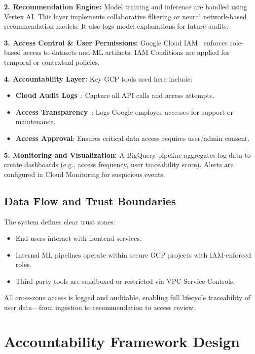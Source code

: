 \documentclass[acmsmall]{acmart}
\begin{document}
\textbf{2. Recommendation Engine:}  
Model training and inference are handled using Vertex AI. This layer implements collaborative filtering or neural network-based recommendation models. It also logs model explanations for future audits.

\textbf{3. Access Control \& User Permissions:}  
Google Cloud IAM~\cite{gcp_iam} enforces role-based access to datasets and ML artifacts. IAM Conditions are applied for temporal or contextual policies.

\textbf{4. Accountability Layer:}  
Key GCP tools used here include:
\begin{itemize}
  \item \textbf{Cloud Audit Logs}~\cite{gcp_auditlogs}: Capture all API calls and access attempts.
  \item \textbf{Access Transparency}~\cite{gcp_transparency}: Logs Google employee accesses for support or maintenance.
  \item \textbf{Access Approval}: Ensures critical data access requires user/admin consent.
\end{itemize}

\textbf{5. Monitoring and Visualization:}  
A BigQuery pipeline aggregates log data to create dashboards (e.g., access frequency, user traceability score). Alerts are configured in Cloud Monitoring for suspicious events.

\subsection{Data Flow and Trust Boundaries}

The system defines clear trust zones:
\begin{itemize}
  \item End-users interact with frontend services.
  \item Internal ML pipelines operate within secure GCP projects with IAM-enforced roles.
  \item Third-party tools are sandboxed or restricted via VPC Service Controls.
\end{itemize}

All cross-zone access is logged and auditable, enabling full lifecycle traceability of user data—from ingestion to recommendation to access review.

\section{Accountability Framework Design}
\end{document}
